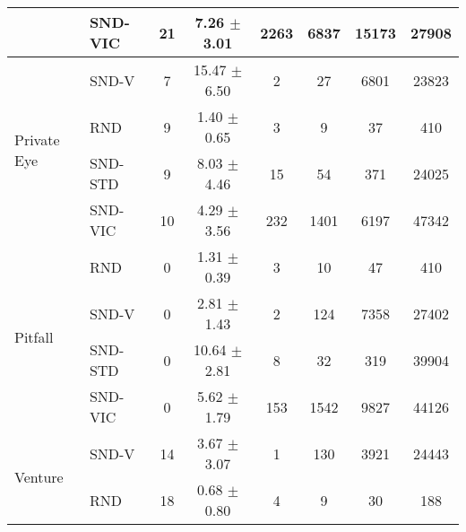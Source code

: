 \documentclass[a4paper,11pt]{elsarticle}
\begin{document}
\begin{table}[t!]
\begin{tabular}{l|l|cccccc}
& \multicolumn{1}{l|}{SND-VIC} & \multicolumn{1}{c}{21} & \multicolumn{1}{c}{7.26 $\pm$ 3.01} & \multicolumn{1}{c}{2263} & \multicolumn{1}{c}{6837} & \multicolumn{1}{c}{15173} & \multicolumn{1}{c}{27908} \\
\hline \multirow{4}{*}{Private Eye}
& \multicolumn{1}{l|}{SND-V} & \multicolumn{1}{c}{7} & \multicolumn{1}{c}{15.47 $\pm$ 6.50} & \multicolumn{1}{c}{2} & \multicolumn{1}{c}{27} & \multicolumn{1}{c}{6801} & \multicolumn{1}{c}{23823} \\
& \multicolumn{1}{l|}{RND} & \multicolumn{1}{c}{9} & \multicolumn{1}{c}{1.40 $\pm$ 0.65} & \multicolumn{1}{c}{3} & \multicolumn{1}{c}{9} & \multicolumn{1}{c}{37} & \multicolumn{1}{c}{410} \\ 
& \multicolumn{1}{l|}{SND-STD} & \multicolumn{1}{c}{9} & \multicolumn{1}{c}{8.03 $\pm$ 4.46} & \multicolumn{1}{c}{15} & \multicolumn{1}{c}{54} & \multicolumn{1}{c}{371} & \multicolumn{1}{c}{24025} \\
& \multicolumn{1}{l|}{SND-VIC} & \multicolumn{1}{c}{10} & \multicolumn{1}{c}{4.29 $\pm$ 3.56} & \multicolumn{1}{c}{232} & \multicolumn{1}{c}{1401} & \multicolumn{1}{c}{6197} & \multicolumn{1}{c}{47342} \\
\hline \multirow{4}{*}{Pitfall}
& \multicolumn{1}{l|}{RND} & \multicolumn{1}{c}{0} & \multicolumn{1}{c}{1.31 $\pm$ 0.39} & \multicolumn{1}{c}{3} & \multicolumn{1}{c}{10} & \multicolumn{1}{c}{47} & \multicolumn{1}{c}{410} \\
& \multicolumn{1}{l|}{SND-V} & \multicolumn{1}{c}{0} & \multicolumn{1}{c}{2.81 $\pm$ 1.43} & \multicolumn{1}{c}{2} & \multicolumn{1}{c}{124} & \multicolumn{1}{c}{7358} & \multicolumn{1}{c}{27402} \\
& \multicolumn{1}{l|}{SND-STD} & \multicolumn{1}{c}{0} & \multicolumn{1}{c}{10.64 $\pm$ 2.81} & \multicolumn{1}{c}{8} & \multicolumn{1}{c}{32} & \multicolumn{1}{c}{319} & \multicolumn{1}{c}{39904} \\
& \multicolumn{1}{l|}{SND-VIC} & \multicolumn{1}{c}{0} & \multicolumn{1}{c}{5.62 $\pm$ 1.79} & \multicolumn{1}{c}{153} & \multicolumn{1}{c}{1542} & \multicolumn{1}{c}{9827} & \multicolumn{1}{c}{44126} \\
\hline \multirow{4}{*}{Venture}
& \multicolumn{1}{l|}{SND-V} & \multicolumn{1}{c}{14} & \multicolumn{1}{c}{3.67 $\pm$ 3.07} & \multicolumn{1}{c}{1} & \multicolumn{1}{c}{130} & \multicolumn{1}{c}{3921} & \multicolumn{1}{c}{24443} \\
& \multicolumn{1}{l|}{RND} & \multicolumn{1}{c}{18} & \multicolumn{1}{c}{0.68 $\pm$ 0.80} & \multicolumn{1}{c}{4} & \multicolumn{1}{c}{9} & \multicolumn{1}{c}{30} & \multicolumn{1}{c}{188} \\ 

\end{tabular}
\end{table}
\end{document}
